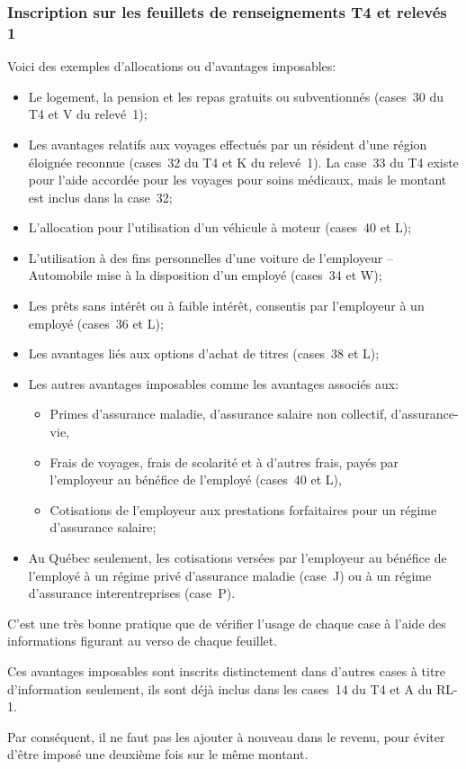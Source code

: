 \subsubsection{Inscription sur les feuillets de renseignements T4 et relevés 1}
Voici des exemples d'allocations ou d'avantages imposables:
\begin{itemize}
	\item Le logement, la pension et les repas gratuits ou subventionnés (cases~30 du T4 et V du relevé~1);
	\item Les avantages relatifs aux voyages effectués par un résident d'une région éloignée reconnue (cases~32 du T4 et K du relevé~1). La case~33 du T4 existe pour l'aide accordée pour les voyages pour soins médicaux, mais le montant est inclus dans la case~32;
	\item L'allocation pour l'utilisation d'un véhicule à moteur (cases~40 et L);
	\item L'utilisation à des fins personnelles d'une voiture de l'employeur – Automobile mise à la disposition d'un employé (cases~34 et W);
	\item Les prêts sans intérêt ou à faible intérêt, consentis par l'employeur à un employé (cases~36 et L);
	\item Les avantages liés aux options d'achat de titres (cases~38 et L);
	\item Les autres avantages imposables comme les avantages associés aux:
	\begin{itemize}
		\item Primes d'assurance maladie, d'assurance salaire non collectif, d'assurance-vie,
		\item Frais de voyages, frais de scolarité et à d'autres frais, payés par l'employeur au bénéfice de l'employé (cases~40 et L),
		\item Cotisations de l'employeur aux prestations forfaitaires pour un régime d'assurance salaire;
	\end{itemize}
	\item Au Québec seulement, les cotisations versées par l'employeur au bénéfice de l'employé à un régime privé d'assurance maladie (case~J) ou à un régime d'assurance interentreprises (case~P).
\end{itemize}
\begin{note}
	C'est une très bonne pratique que de vérifier l'usage de chaque case à l'aide des informations figurant au verso de chaque feuillet.
	
	Ces avantages imposables sont inscrits distinctement dans d'autres cases à titre d'information seulement, ils sont déjà inclus dans les cases~14 du T4 et A du RL-1. 
	
	Par conséquent, il ne faut pas les ajouter à nouveau dans le revenu, pour éviter d'être imposé une deuxième fois sur le même montant. 
\end{note}

